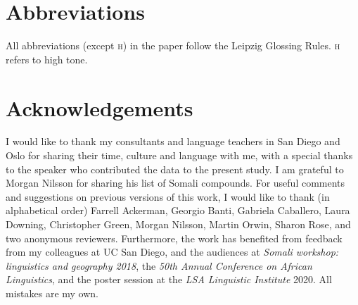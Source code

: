 \documentclass[output=paper]{langscibook}
\begin{document}
\section*{Abbreviations}

All abbreviations (except \textsc{h}) in the paper follow the Leipzig Glossing Rules. \textsc{h} refers to high tone.


\section*{Acknowledgements}
I would like to thank my consultants and language teachers in San Diego and Oslo for sharing their time, culture and language with me, with a special thanks to the speaker who contributed the data to the present study. I am grateful to Morgan Nilsson for sharing his list of Somali compounds. For useful comments and suggestions on previous versions of this work, I would like to thank (in alphabetical order) Farrell Ackerman, Georgio Banti, Gabriela Caballero, Laura Downing, Christopher Green, Morgan Nilsson, Martin Orwin, Sharon Rose, and two anonymous reviewers. Furthermore, the work has benefited from feedback from my colleagues at UC San Diego, and the audiences at \textit{Somali workshop: linguistics and geography 2018}, the \textit{50th Annual Conference on African Linguistics}, and the poster session at the \textit{LSA Linguistic Institute} 2020. All mistakes are my own.
\end{document}
